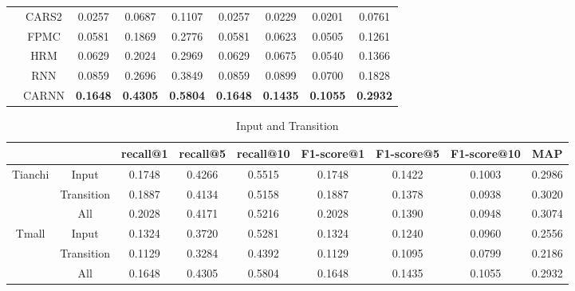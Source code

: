 \documentclass[conference]{IEEEtran}
\begin{document}
\begin{table}[htbp]
\begin{tabular}{ccccccccc}
        & CARS2   &0.0257   &0.0687  & 0.1107   &0.0257  & 0.0229   &0.0201  & 0.0761 \\
        & FPMC    & 0.0581  & 0.1869  & 0.2776  & 0.0581   &0.0623  & 0.0505  & 0.1261 \\
        & HRM   & 0.0629   &0.2024   &0.2969 &  0.0629 &  0.0675 &  0.0540   &0.1366 \\
        & RNN   & 0.0859   &0.2696 &  0.3849  & 0.0859  & 0.0899 &  0.0700   &0.1828 \\
        & CARNN    & \textbf{0.1648}   &\textbf{0.4305}  &\textbf{ 0.5804}   &\textbf{0.1648}   &\textbf{0.1435} &  \textbf{0.1055 }& \textbf{ 0.2932} \\
    \bottomrule
\end{tabular}%
\label{tab:result}%
\end{table}%




\begin{table}[htbp]
\centering\scriptsize
\caption{Input and Transition}
\begin{tabular}{ccccccccc}
    \toprule
          &  & recall@1 & recall@5 & recall@10 & F1-score@1 & F1-score@5 & F1-score@10 & MAP   \\
    \midrule
    \multirow{3}[0]{*}{Tianchi} 
        &Input   &0.1748 &0.4266 & 0.5515  &0.1748  &0.1422  &0.1003  &0.2986   \\
        &Transition  &0.1887 & 0.4134  &0.5158&  0.1887& 0.1378  &0.0938&  0.3020   \\
        &All &0.2028  &0.4171  &0.5216  &0.2028  &0.1390  &0.0948 & 0.3074\\
    \midrule
    \multirow{3}[0]{*}{Tmall} 
        &Input   &0.1324  &0.3720  &0.5281  &0.1324  &0.1240 & 0.0960  &0.2556   \\
        &Transition  &0.1129  &0.3284  &0.4392  &0.1129  &0.1095  &0.0799  &0.2186   \\
        &All &0.1648  &0.4305  &0.5804  &0.1648 & 0.1435&  0.1055  &0.2932\\
    \bottomrule
\end{tabular}%
\label{tab:InputAndTransition}%
\end{table}%
\end{document}
